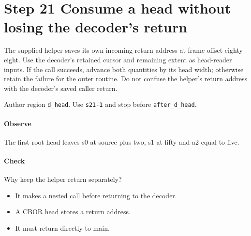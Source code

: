 \section{Step 21 Consume a head without losing the decoder's return}\label{cbor-s21}
The supplied helper saves its own incoming return address at frame offset eighty-eight. Use the decoder's retained cursor and remaining extent as head-reader inputs. If the call succeeds, advance both quantities by its head width; otherwise retain the failure for the outer routine. Do not confuse the helper's return address with the decoder's saved caller return.

Author region \texttt{d\_head}. Use \texttt{s21-1} and stop before \texttt{after\_d\_head}.

\paragraph{Observe} The first root head leaves s0 at source plus two, s1 at fifty and a2 equal to five.

\paragraph{Check} Why keep the helper return separately?
\begin{itemize}
\item[A.] It makes a nested call before returning to the decoder.
\item[B.] A CBOR head stores a return address.
\item[C.] It must return directly to main.
\end{itemize}
